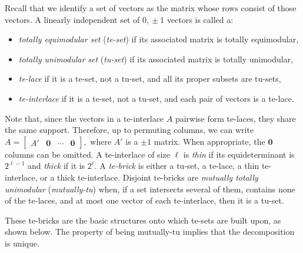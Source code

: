 \documentclass[11pt,a4paper]{amsart}
\theoremstyle{plain}
\theoremstyle{definition}
\begin{document}
Recall that we identify a set of vectors as the matrix whose rows consist of those vectors.
A linearly independent set of $0,\!\pm1$ vectors is called a:
\begin{itemize}
	\item \emph{totally equimodular set} (\emph{te-set}) if its associated matrix is totally equimodular,
	\item \emph{totally unimodular set} (\emph{tu-set}) if its associated matrix is totally unimodular,
	\item \emph{te-lace} if it is a te-set, not a tu-set, and all its proper subsets are tu-sets,
	\item \emph{te-interlace} if it is a te-set, not a tu-set, and each pair of vectors is a te-lace.
\end{itemize}
Note that, since the vectors in a te-interlace \( A \) pairwise form te-laces, they share the same support. 
Therefore, up to permuting columns, we can write $A = \begin{bmatrix} A' & \mathbf{0} & \cdots & \mathbf{0} \end{bmatrix},$ where $A'$ is a $\pm 1$ matrix. 
When appropriate, the $\mathbf{0}$ columns can be omitted.
A te-interlace of size $\ell$ is {\em thin} if its equideterminant is $2^{\ell - 1}$ and {\em thick} if it is $2^\ell$.
A \emph{te-brick} is either a tu-set, a te-lace, a thin te-interlace, or a thick te-interlace.
Disjoint te-bricks are {\em mutually totally unimodular} (\emph{mutually-tu}) when, if a set intersects several of them, contains none of the te-laces, and at most one vector of each te-interlace, then it is a tu-set.

\medskip

These te-bricks are the basic structures onto which te-sets are built upon, as shown below.
The property of being mutually-tu implies that the decomposition is unique.
\end{document}
